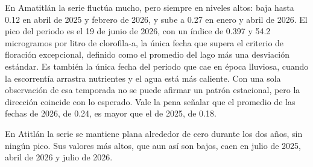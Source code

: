 \documentclass[10pt,a4paper]{article}
\begin{document}
En Amatitlán la serie fluctúa mucho, pero siempre en niveles altos: baja hasta 0.12 en abril de 2025 y febrero de
2026, y sube a 0.27 en enero y abril de 2026. El pico del periodo es el 19 de junio de 2026, con un índice de 0.397
y 54.2 microgramos por litro de clorofila-a, la única fecha que supera el criterio de floración excepcional,
definido como el promedio del lago más una desviación estándar. Es también la única fecha del periodo que cae en
época lluviosa, cuando la escorrentía arrastra nutrientes y el agua está más caliente. Con una sola observación de
esa temporada no se puede afirmar un patrón estacional, pero la dirección coincide con lo esperado. Vale la pena
señalar que el promedio de las fechas de 2026, de 0.24, es mayor que el de 2025, de 0.18.

En Atitlán la serie se mantiene plana alrededor de cero durante los dos años, sin ningún pico. Sus valores más
altos, que aun así son bajos, caen en julio de 2025, abril de 2026 y julio de 2026.
\end{document}
